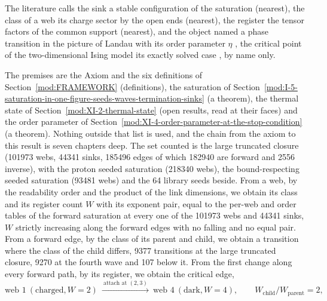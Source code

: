\begin{chbridge}
The literature calls the sink a stable configuration of the saturation (nearest), the class of a web its charge sector by the open ends (nearest), the register the tensor factors of the common support (nearest), and the object named a phase transition in the picture of Landau with its order parameter $\eta$ \cite{Landau1937}, the critical point of the two-dimensional Ising model its exactly solved case \cite{Onsager1944}, by name only.
\end{chbridge}
\begin{chproof}[census]
The premises are the Axiom and the six definitions of Section~\ref{mod:FRAMEWORK} (definitions), the saturation of Section~\ref{mod:I-5-saturation-in-one-figure-seeds-waves-termination-sinks} (a theorem), the thermal state of Section~\ref{mod:XI-2-thermal-state} (open results, read at their faces) and the order parameter of Section~\ref{mod:XI-4-order-parameter-at-the-stop-condition} (a theorem). Nothing outside that list is used, and the chain from the axiom to this result is seven chapters deep.
The set counted is the large truncated closure (101973 webs, 44341 sinks, 185496 edges of which 182940 are forward and 2556 inverse), with the proton seeded saturation (218340 webs), the bound-respecting seeded saturation (93481 webs) and the 64 library seeds beside. From a web, by the readability order and the product of the link dimensions, we obtain its class and its register count $W$ with its exponent pair, equal to the per-web and order tables of the forward saturation at every one of the 101973 webs and 44341 sinks, $W$ strictly increasing along the forward edges with no falling and no equal pair. From a forward edge, by the class of its parent and child, we obtain a transition where the class of the child differs, 9377 transitions at the large truncated closure, 9270 at the fourth wave and 107 below it. From the first change along every forward path, by its register, we obtain the critical edge,
\begin{equation}
\text{web } 1 \ (\text{charged}, W = 2) \ \xrightarrow{\ \text{attach at } (2,3)\ } \ \text{web } 4 \ (\text{dark}, W = 4), \qquad W_{\mathrm{child}} / W_{\mathrm{parent}} = 2 ,
\end{equation}

\end{chproof}

